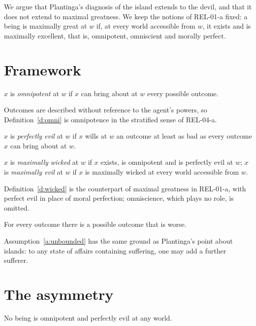 \documentclass{situationist-preprint}
\begin{document}
We argue that Plantinga's diagnosis of the island extends to the devil, and that it does not extend to maximal greatness. We keep the notions of REL-01-a fixed: a being is maximally great at $w$ if, at every world accessible from $w$, it exists and is maximally excellent, that is, omnipotent, omniscient and morally perfect.

\section{Framework}

\begin{definition}\label{d:omni}
$x$ is \emph{omnipotent} at $w$ if $x$ can bring about at $w$ every possible outcome.
\end{definition}

Outcomes are described without reference to the agent's powers, so Definition~\ref{d:omni} is omnipotence in the stratified sense of REL-04-a.

\begin{definition}\label{d:evil}
$x$ is \emph{perfectly evil} at $w$ if $x$ wills at $w$ an outcome at least as bad as every outcome $x$ can bring about at $w$.
\end{definition}

\begin{definition}\label{d:wicked}
$x$ is \emph{maximally wicked} at $w$ if $x$ exists, is omnipotent and is perfectly evil at $w$; $x$ is \emph{maximally evil} at $w$ if $x$ is maximally wicked at every world accessible from $w$.
\end{definition}

Definition~\ref{d:wicked} is the counterpart of maximal greatness in REL-01-a, with perfect evil in place of moral perfection; omniscience, which plays no role, is omitted.

\begin{assumption}\label{a:unbounded}
For every outcome there is a possible outcome that is worse.
\end{assumption}

Assumption~\ref{a:unbounded} has the same ground as Plantinga's point about islands: to any state of affairs containing suffering, one may add a further sufferer.

\section{The asymmetry}

\begin{lemma}\label{l:nomax}
No being is omnipotent and perfectly evil at any world.
\end{lemma}
\end{document}

